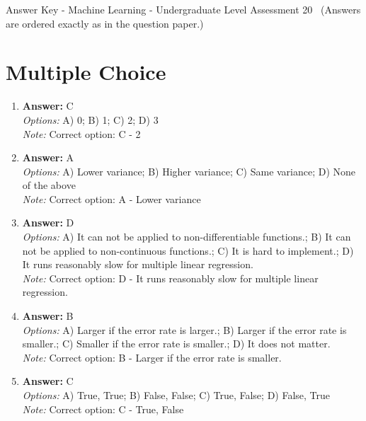 \documentclass[12pt]{article}
\begin{document}
\begin{center}
Answer Key - Machine Learning - Undergraduate Level Assessment 20 \
\small (Answers are ordered exactly as in the question paper.)
\end{center}

\section*{Multiple Choice}
\begin{enumerate}[label=\arabic*.]
\item \textbf{Answer:} C
\\ \textit{Options:} A) 0; B) 1; C) 2; D) 3
\\ \textit{Note:} Correct option: C - 2
\item \textbf{Answer:} A
\\ \textit{Options:} A) Lower variance; B) Higher variance; C) Same variance; D) None of the above
\\ \textit{Note:} Correct option: A - Lower variance
\item \textbf{Answer:} D
\\ \textit{Options:} A) It can not be applied to non-differentiable functions.; B) It can not be applied to non-continuous functions.; C) It is hard to implement.; D) It runs reasonably slow for multiple linear regression.
\\ \textit{Note:} Correct option: D - It runs reasonably slow for multiple linear regression.
\item \textbf{Answer:} B
\\ \textit{Options:} A) Larger if the error rate is larger.; B) Larger if the error rate is smaller.; C) Smaller if the error rate is smaller.; D) It does not matter.
\\ \textit{Note:} Correct option: B - Larger if the error rate is smaller.
\item \textbf{Answer:} C
\\ \textit{Options:} A) True, True; B) False, False; C) True, False; D) False, True
\\ \textit{Note:} Correct option: C - True, False
\end{enumerate}
\end{document}

